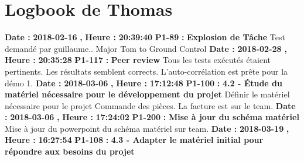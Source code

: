 \documentclass{article}%
\begin{document}
%
\section{Logbook de Thomas}%
\textbf{Date : }%
\textbf{2018{-}02{-}16}%
\textbf{,}%
\textbf{ Heure : }%
\textbf{20:39:40}%
\newline%
%
\textbf{P1{-}89 }%
\textbf{ : }%
\textbf{ Explosion de Tâche}%
\newline%
\newline%
%
Test demandé par guillaume.. Major Tom to Ground Control\newline%
\newline%
%
\textbf{Date : }%
\textbf{2018{-}02{-}28}%
\textbf{,}%
\textbf{ Heure : }%
\textbf{20:35:28}%
\newline%
%
\textbf{P1{-}117 }%
\textbf{ : }%
\textbf{ Peer review}%
\newline%
\newline%
%
Tous les tests exécutés étaient pertinents. Les résultats semblent corrects. L'auto{-}corrélation est prête pour la démo 1.\newline%
\newline%
%
\textbf{Date : }%
\textbf{2018{-}03{-}06}%
\textbf{,}%
\textbf{ Heure : }%
\textbf{17:12:48}%
\newline%
%
\textbf{P1{-}100 }%
\textbf{ : }%
\textbf{ 4.2 {-} Étude du matériel nécessaire pour le développement du projet}%
\newline%
\newline%
%
Définir le matériel nécessaire pour le projet\newline%
Commande des pièces.\newline%
La facture est sur le team.\newline%
\newline%
%
\textbf{Date : }%
\textbf{2018{-}03{-}06}%
\textbf{,}%
\textbf{ Heure : }%
\textbf{17:24:02}%
\newline%
%
\textbf{P1{-}200 }%
\textbf{ : }%
\textbf{ Mise à jour du schéma matériel}%
\newline%
\newline%
%
Mise à jour du powerpoint du schéma matériel sur team.\newline%
\newline%
%
\textbf{Date : }%
\textbf{2018{-}03{-}19}%
\textbf{,}%
\textbf{ Heure : }%
\textbf{16:27:54}%
\newline%
%
\textbf{P1{-}108 }%
\textbf{ : }%
\textbf{ 4.3 {-} Adapter le matériel initial pour répondre aux besoins du projet}%
\newline%
\end{document}

